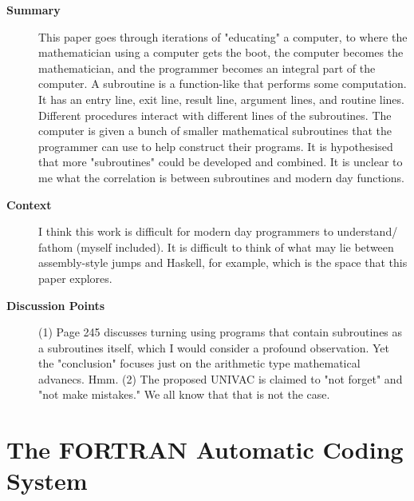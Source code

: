 \begin{description}
    \item[\textbf{Summary}] This paper goes through iterations of "educating"
    a computer, to where the mathematician using a computer gets the boot, the
    computer becomes the mathematician, and the programmer becomes an integral
    part of the computer. A subroutine is a function-like that performs some
    computation. It has an entry line, exit line, result line, argument lines,
    and routine lines. Different procedures interact with different lines of the
    subroutines. The computer is given a bunch of smaller mathematical
    subroutines that the programmer can use to help construct their programs.
    It is hypothesised that more "subroutines" could be developed and combined.
    It is unclear to me what the correlation is between subroutines and modern
    day functions.
    \item[\textbf{Context}] I think this work is difficult for modern day 
    programmers to understand/ fathom (myself included). It is difficult to
    think of what may lie between assembly-style jumps and Haskell, for example,
     which is the space that this paper explores.
    \item[\textbf{Discussion Points}] (1) Page 245 discusses turning using
    programs that contain subroutines as a subroutines itself, which I would
    consider a profound observation. Yet the "conclusion" focuses just on the
    arithmetic type mathematical advanecs. Hmm.
    (2) The proposed UNIVAC is claimed to "not forget" and "not make mistakes."
    We all know that that is not the case.
\end{description}

\section {The FORTRAN Automatic Coding System \cite{backus1957fortran}}

